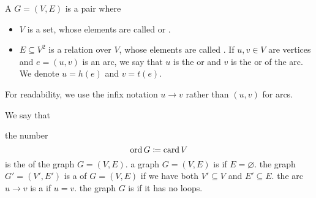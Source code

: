\begin{definition}\label{def:directed_graph}\cite[1-graphs from chapter 1, section 1.1]{Gondran1984}
  A  \( G = (V, E) \) is a pair where
  \begin{itemize}
    \item \( V \) is a set, whose elements are called  or .
    \item \( E \subseteq V^2 \) is a relation over \( V \), whose elements are called . If \( u, v \in V \) are vertices and \( e = (u, v) \) is an arc, we say that \( u \) is the  or  and \( v \) is the  or  of the arc. We denote $u = h(e)$ and $v = t(e)$.
  \end{itemize}

  For readability, we use the infix notation \( u \to v \) rather than \( (u, v) \) for arcs.

  We say that
  \begin{defenum}
     the number
    \begin{equation*}
      \operatorname{ord} G \coloneqq \operatorname{card} V
    \end{equation*}
    is the  of the graph \( G = (V, E) \).
     a graph \( G = (V, E) \) is  if \( E = \varnothing \).
     the graph \( G' = (V', E') \) is a  of \( G = (V, E) \) if we have both \( V' \subseteq V \) and \( E' \subseteq E \).
     the arc \( u \to v \) is a  if \( u = v \).
    \cite[chapter 1, section 1.3]{Gondran1984} the graph \( G \) is  if it has no loops.
  \end{defenum}
\end{definition}

